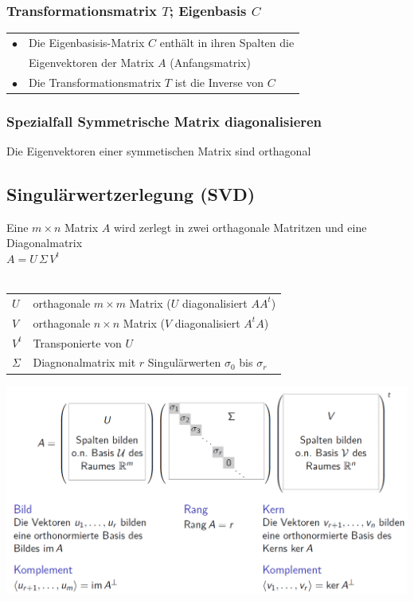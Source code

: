 			
			

			\subsubsection{Transformationsmatrix $T$; Eigenbasis $C$}
			\begin{tabular}{ll}
			$\bullet$ & Die Eigenbasisis-Matrix $C$ enthält in ihren Spalten die \\
			& Eigenvektoren der Matrix $A$ (Anfangsmatrix) \\
			$\bullet$ & Die Transformationsmatrix $T$ ist die Inverse von $C$ \\
			\end{tabular}
			
			\subsubsection{Spezialfall Symmetrische Matrix diagonalisieren}
		    
			Die Eigenvektoren einer symmetischen Matrix sind orthagonal \\
		   
		   
		   \subsection{Singulärwertzerlegung (SVD)}
			Eine $m \times n$ Matrix $A$ wird zerlegt in zwei orthagonale Matritzen und eine Diagonalmatrix \\
			$A = U \, \Sigma \, V^t$	 \\	  
			\\
			\begin{tabular}{ll}
			$U$ & orthagonale $m \times m$ Matrix  ($U$ diagonalisiert $AA^t$)\\
			$V$ & orthagonale $n \times n$ Matrix ($V$ diagonalisiert $A^tA$)\\
			$V^t$ & Transponierte von $U$ \\
			$\Sigma$ & Diagnonalmatrix mit $r$ Singulärwerten $\sigma_0$ bis $\sigma_r$ \\
			\end{tabular}			 
		   
		   \includegraphics[width=0.65\linewidth]{Bilder/SVD} \\
		   
